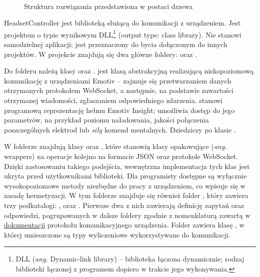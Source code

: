 \documentclass[skorowidz,skroty]{dyplomWEZUT}
\begin{document}
\begin{figure}[!htb]
	\centering
    \begin{minipage}{\textwidth}
    \end{minipage}\\
	\caption{Struktura rozwiązania przedstawiona w postaci drzewa\label{fig:solution_structure}}
\end{figure}


HeadsetController jest biblioteką służącą do komunikacji z urządzeniem. Jest projektem o typie wynikowym DLL\footnote{DLL (\textit{ang.} Dynamic-link library) -- biblioteka łączona dynamicznie; rodzaj biblioteki łączonej z programem dopiero w trakcie jego wykonywania.} (output type: class library). Nie stanowi samodzielnej aplikacji; jest przeznaczony do bycia dołączonym do innych projektów. W projekcie znajdują się dwa główne foldery:  oraz . 

Do folderu  należą klasy  oraz .  jest klasą abstrakcyjną realizującą niskopoziomową komunikację z urządzeniami Emotiv -- zajmuje się przetwarzaniem danych otrzymanych protokołem WebSocket, a następnie, na podstawie zawartości otrzymanej wiadomości, zgłaszaniem odpowiedniego zdarzenia.  stanowi programową reprezentację hełmu Emotiv Insight; umożliwia dostęp do jego parametrów, na przykład poziomu naładowania, jakości połączenia poszczególnych elektrod lub \textit{siły} komend mentalnych. Dziedziczy po klasie .

W folderze  znajdują klasy  oraz , które stanowią klasy opakowujące (\textit{ang.} wrappers) na operacje kolejno na formacie JSON oraz protokole WebSocket. Dzięki zastosowaniu takiego podejścia, wewnętrzna implementacja tych klas jest ukryta przed użytkownikami biblioteki. Dla programisty dostępne są wyłącznie wysokopoziomowe metody niezbędne do pracy z urządzeniem, co wpisuje się w zasadę hermetyzacji. W tym folderze znajduje się również folder , który zawiera trzy podkatalogi: ,  oraz . Pierwsze dwa z nich zawierają definicję zapytań oraz odpowiedzi, pogrupowanych w dalsze foldery zgodnie z nomenklaturą zawartą w \href{https://emotiv.gitbook.io/cortex-api/}{dokumentacji} protokołu komunikacyjnego urządzenia. Folder  zawiera klasę , w której umieszczone są typy wyliczeniowe wykorzystywane do komunikacji.
\end{document}
